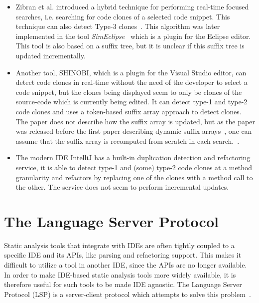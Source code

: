 \begin{itemize}

    \item Zibran et al. introduced a hybrid technique for performing real-time focused
        searches, i.e. searching for code clones of a selected code snippet. This
        technique can also detect Type-3 clones~\cite{Zibran_real_time_search}. This
        algorithm was later implemented in the tool
        \textit{SimEclipse}~\cite{Udding_Towards_Convenient_Management} which is a plugin
        for the Eclipse editor. This tool is also based on a suffix tree, but it is
        unclear if this suffix tree is updated incrementally.

    \item Another tool, SHINOBI, which is a plugin for the Visual Studio editor, can
        detect code clones in real-time without the need of the developer to select a code
        snippet, but the clones being displayed seem to only be clones of the source-code
        which is currently being edited. It can detect type-1 and type-2 code clones and
        uses a token-based suffix array approach to detect clones. The paper does not
        describe how the suffix array is updated, but as the paper was released before the
        first paper describing dynamic suffix arrays~\cite{DynamicExtendedSuffixArrays},
        one can assume that the suffix array is recomputed from scratch in each
        search.~\cite{SHINOBI}.

	\item The modern IDE IntelliJ has a built-in duplication detection and refactoring
	      service, it is able to detect type-1 and (some) type-2 code clones at a method
	      granularity and refactors by replacing one of the clones with a method call to the
	      other. The service does not seem to perform incremental updates.

\end{itemize}

\section{The Language Server Protocol}

Static analysis tools that integrate with IDEs are often tightly coupled to a specific IDE
and its APIs, like parsing and refactoring support. This makes it difficult to utilize a
tool in another IDE, since the APIs are no longer available. In order to make IDE-based
static analysis tools more widely available, it is therefore useful for such tools to be
made IDE agnostic. The Language Server Protocol (LSP) is a server-client protocol which
attempts to solve this problem~\cite{lsp}.

